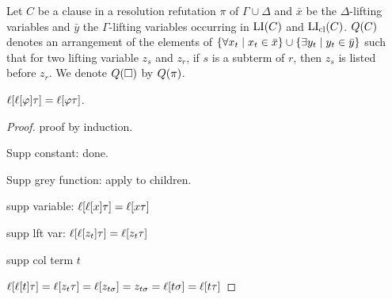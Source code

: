 \documentclass[,%
	draft=false,%
	numbers=noendperiod
	11pt,
	a4paper,
	oneside,%
	openany,
]{memoir}
\begin{document}
\begin{defi}
	\label{def:arrow_quantifier_block}
	Let $C$ be a clause in a resolution refutation $\pi$ of $\Gamma\cup\Delta$
	and $\bar x$ be the $\Delta$-lifting variables and $\bar y$ the $\Gamma$-lifting variables occurring in $\operatorname{LI}(C)$ and $\operatorname{LI}_{\operatorname{cl}}(C)$.
	$Q(C)$ denotes an arrangement of the elements of  $\{ \forall x_t \mid\nolinebreak x_t \in \bar x\} \cup \{ \exists y_t \mid y_t \in \bar y\}$ such that for two lifting variable $z_s$ and $z_r$, if $s$ is a subterm of $r$, then $z_s$ is listed before $z_r$.
	We denote $Q(\square)$ by $Q(\pi)$.
\end{defi}


\begin{clemma}
	$\ell[\ell[ \varphi] \tau] = \ell[ \varphi \tau ] $.
\end{clemma}
\begin{proof}
	proof by induction.

	Supp constant: done.

	Supp grey function: apply to children.

	supp variable:
	$\ell[\ell[x]\tau] = \ell[x\tau]$

	supp lft var:
	$\ell[\ell[z_t]\tau] = \ell[z_t\tau]$

	supp col term $t$

	$\ell[\ell[t]\tau] = \ell[z_t\tau] = \ell[z_{t\sigma}] = z_{t\sigma}
	= \ell[t\sigma] = \ell[t\tau]$



\end{proof}
\end{document}

